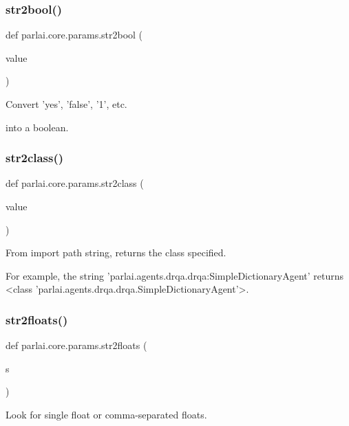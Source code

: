 \subsubsection{\texorpdfstring{str2bool()}{str2bool()}}
{\footnotesize\ttfamily def parlai.\+core.\+params.\+str2bool (\begin{DoxyParamCaption}\item[{}]{value }\end{DoxyParamCaption})}

\begin{DoxyVerb}Convert 'yes', 'false', '1', etc.

into a boolean.
\end{DoxyVerb}
 \mbox{\label{namespaceparlai_1_1core_1_1params_aa6083a72ad328d26016bd5f805a0b1c8}} 
\subsubsection{\texorpdfstring{str2class()}{str2class()}}
{\footnotesize\ttfamily def parlai.\+core.\+params.\+str2class (\begin{DoxyParamCaption}\item[{}]{value }\end{DoxyParamCaption})}

\begin{DoxyVerb}From import path string, returns the class specified.

For example, the string 'parlai.agents.drqa.drqa:SimpleDictionaryAgent' returns
<class 'parlai.agents.drqa.drqa.SimpleDictionaryAgent'>.
\end{DoxyVerb}
 \mbox{\label{namespaceparlai_1_1core_1_1params_a3ef8c61c55a77674dd852c5b9f21e560}} 
\subsubsection{\texorpdfstring{str2floats()}{str2floats()}}
{\footnotesize\ttfamily def parlai.\+core.\+params.\+str2floats (\begin{DoxyParamCaption}\item[{}]{s }\end{DoxyParamCaption})}

\begin{DoxyVerb}Look for single float or comma-separated floats.
\end{DoxyVerb}
 